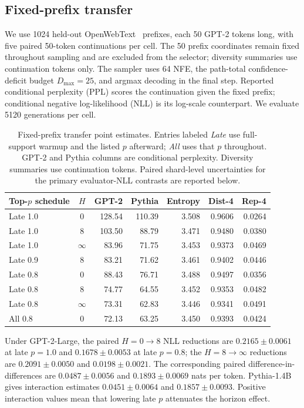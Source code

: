 \documentclass{article}
\newcommand{\1}{\mathbf 1}
\theoremstyle{definition}
\begin{document}
\subsection{Fixed-prefix transfer}

We use 1024 held-out OpenWebText~\citep{gokaslan2019openwebtext} prefixes, each 50 GPT-2 tokens long, with five
paired 50-token continuations per cell. The 50 prefix coordinates remain fixed
throughout sampling and are excluded from the selector; diversity summaries
use continuation tokens only. The sampler uses 64 NFE, the path-total
confidence-deficit budget $D_{\max}=25$, and argmax decoding in the final step. Reported conditional
perplexity (PPL) scores the continuation given the fixed prefix; conditional
negative log-likelihood (NLL)
is its log-scale counterpart. We evaluate 5120 generations per cell.

\begin{table}[H]
\centering
\small
\setlength{\tabcolsep}{3pt}
\begin{tabular}{@{}lcrrrrr@{}}
\toprule
Top-$p$ schedule & $H$ & GPT-2 & Pythia & Entropy & Dist-4 & Rep-4 \\
\midrule
Late 1.0 & 0 & 128.54 & 110.39 & 3.508 & 0.9606 & 0.0264 \\
Late 1.0 & 8 & 103.50 & 88.79 & 3.471 & 0.9480 & 0.0380 \\
Late 1.0 & $\infty$ & 83.96 & 71.75 & 3.453 & 0.9373 & 0.0469 \\
Late 0.9 & 8 & 83.21 & 71.62 & 3.461 & 0.9402 & 0.0446 \\
Late 0.8 & 0 & 88.43 & 76.71 & 3.488 & 0.9497 & 0.0356 \\
Late 0.8 & 8 & 74.77 & 64.55 & 3.452 & 0.9353 & 0.0482 \\
Late 0.8 & $\infty$ & 73.31 & 62.83 & 3.446 & 0.9341 & 0.0491 \\
\midrule
All 0.8 & 0 & 72.13 & 63.25 & 3.450 & 0.9393 & 0.0424 \\
\bottomrule
\end{tabular}
\caption{Fixed-prefix transfer point estimates. Entries labeled \emph{Late} use full-support
warmup and the listed $p$ afterward; \emph{All} uses that $p$ throughout.
GPT-2 and Pythia columns are conditional perplexity. Diversity summaries use
continuation tokens. Paired shard-level uncertainties for the primary
evaluator-NLL contrasts are reported below.}
\label{tab:conditional-full-app}
\end{table}

Under GPT-2-Large, the paired $H=0\to8$ NLL reductions are
$0.2165\pm0.0061$ at late $p=1.0$ and $0.1678\pm0.0053$ at late $p=0.8$;
the $H=8\to\infty$ reductions are $0.2091\pm0.0050$ and
$0.0198\pm0.0021$. The corresponding paired difference-in-differences are
$0.0487\pm0.0056$ and $0.1893\pm0.0069$ nats per token. Pythia-1.4B gives
interaction estimates $0.0451\pm0.0064$ and $0.1857\pm0.0093$. Positive
interaction values mean that lowering late $p$ attenuates the horizon effect.
\end{document}
